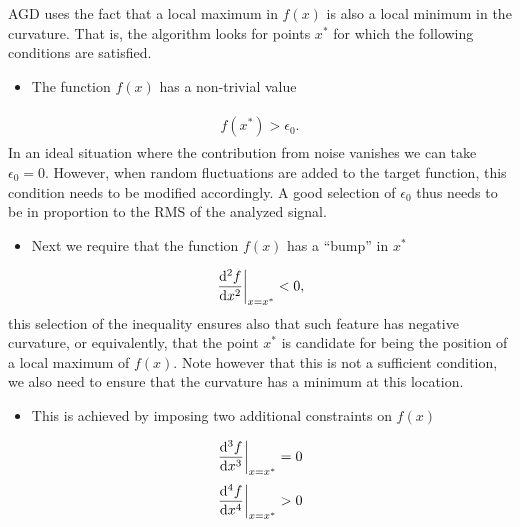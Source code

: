 \documentclass[letterpaper,10pt,openany,oneside]{sphinxmanual}
\begin{document}
AGD uses the fact that a local maximum in \(f(x)\) is also a local
minimum in the curvature. That is, the algorithm looks for points
\(x^*\) for which the following conditions are satisfied.
\begin{itemize}
\item {} 
The function \(f(x)\) has a non-trivial value

\end{itemize}
\label{method:equation-f0const}\begin{gather}
\begin{split}f(x^*) > \epsilon_0.\end{split}\label{method-f0const}
\end{gather}
In an ideal situation where the contribution from noise vanishes we
can take \(\epsilon_0=0\). However, when random fluctuations are
added to the target function, this condition needs to be modified
accordingly. A good selection of \(\epsilon_0\) thus needs to be
in proportion to the RMS of the analyzed signal.
\begin{itemize}
\item {} 
Next we require that the function \(f(x)\) has a ``bump'' in
\(x^*\)

\end{itemize}
\label{method:equation-f2const}\begin{gather}
\begin{split}\left.\frac{{\rm d}^2f}{{\rm d}x^2}\right|_{x=x^*}  < 0,\end{split}\label{method-f2const}
\end{gather}
this selection of the inequality ensures also that such feature has
negative curvature, or equivalently, that the point \(x^*\) is
candidate for being the position of a local maximum of
\(f(x)\). Note however that this is not a sufficient condition, we
also need to ensure that the curvature has a minimum at this location.
\begin{itemize}
\item {} 
This is achieved by imposing two additional constraints on
\(f(x)\)

\end{itemize}
\label{method:equation-f3const}\begin{gather}
\begin{split}\left.\frac{{\rm d}^3f}{{\rm d}x^3}\right|_{x=x^*} = 0\end{split}\label{method-f3const}
\end{gather}\label{method:equation-f4const}\begin{gather}
\begin{split}\left.\frac{{\rm d}^4f}{{\rm d}x^4}\right|_{x=x^*} > 0\end{split}\label{method-f4const}
\end{gather}
\end{document}
